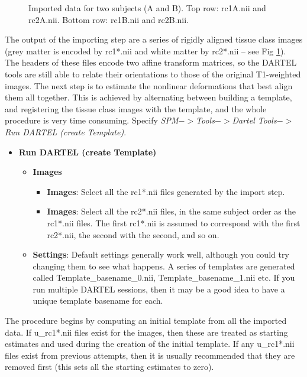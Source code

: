 \begin{figure}
\begin{center}
\end{center}
\caption{
Imported data for two subjects (A and B).
Top row: rc1A.nii and rc2A.nii.
Bottom row: rc1B.nii and rc2B.nii.
\label{Fig:imported}}
\end{figure}

The output of the importing step are a series of rigidly aligned tissue class images (grey matter is encoded by rc1*.nii and white matter by rc2*.nii -- see Fig \ref{Fig:imported}).
The headers of these files encode two affine transform matrices, so the DARTEL tools are still able to relate their orientations to those of the original T1-weighted images.
The next step is to estimate the nonlinear deformations that best align them all together.
This is achieved by alternating between building a template, and registering the tissue class images with the template, and the whole procedure is very time consuming.
Specify \emph{SPM$->$Tools$->$Dartel Tools$->$Run DARTEL (create Template)}.
\begin{itemize}
\item{{\bf Run DARTEL (create Template)}
  \begin{itemize}
  \item{{\bf Images}
    \begin{itemize}
    \item{{\bf Images}: Select all the rc1*.nii files generated by the import step.
    }
    \item{{\bf Images}: Select all the rc2*.nii files, in the same subject order as the rc1*.nii files. The first rc1*.nii is assumed to correspond with the first rc2*.nii, the second with the second, and so on.
    }
    \end{itemize}
  }
  \item{{\bf Settings}: Default settings generally work well, although you could try changing them to see what happens. A series of templates are generated called Template\_basename\_0.nii, Template\_basename\_1.nii etc.  If you run multiple DARTEL sessions, then it may be a good idea to have a unique template basename for each. 
  }
  \end{itemize}
}
\end{itemize}
The procedure begins by computing an initial template from all the imported data.
If u\_rc1*.nii files exist for the images, then these are treated as starting estimates and used during the creation of the initial template.  If any u\_rc1*.nii files exist from previous attempts, then it is usually recommended that they are removed first (this sets all the starting estimates to zero).
